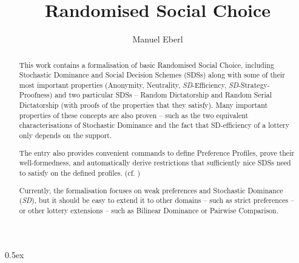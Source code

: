 \documentclass[11pt,a4paper]{article}
\begin{document}
\title{Randomised Social Choice}
\author{Manuel Eberl}
\maketitle

\begin{abstract}
This work contains a formalisation of basic Randomised Social Choice, including Stochastic Dominance
and Social Decision Schemes (SDSs) along with some of their most important properties 
(Anonymity, Neutrality, \textit{SD}-Efficiency, \textit{SD}-Strategy-Proofness) and two particular SDSs -- Random Dictatorship 
and Random Serial Dictatorship (with proofs of the properties that they satisfy). Many important properties of these 
concepts are also proven – such as the two equivalent characterisations of Stochastic Dominance and the fact that 
SD-efficiency of a lottery only depends on the support.

The entry also provides convenient commands to define Preference Profiles, prove their well-formedness, and 
automatically derive restrictions that sufficiently nice SDSs need to satisfy on the defined profiles. (cf. \cite{smt})

Currently, the formalisation focuses on weak preferences and Stochastic Dominance (\textit{SD}), but it should be easy to extend it 
to other domains -- such as strict preferences -- or other lottery extensions -- such as Bilinear Dominance or Pairwise Comparison.
\end{abstract}

\tableofcontents

\parindent 0pt\parskip 0.5ex
\newpage





\end{document}
